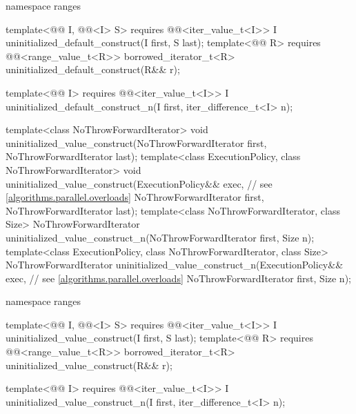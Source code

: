 \begin{codeblock}
{  namespace ranges {
    template<@@ I, @@<I> S>
      requires @@<iter_value_t<I>>
        I uninitialized_default_construct(I first, S last);
    template<@@ R>
      requires @@<range_value_t<R>>
        borrowed_iterator_t<R> uninitialized_default_construct(R&& r);

    template<@@ I>
      requires @@<iter_value_t<I>>
        I uninitialized_default_construct_n(I first, iter_difference_t<I> n);
  }

  template<class NoThrowForwardIterator>
    void uninitialized_value_construct(NoThrowForwardIterator first,
                                       NoThrowForwardIterator last);
  template<class ExecutionPolicy, class NoThrowForwardIterator>
    void uninitialized_value_construct(ExecutionPolicy&& exec,  // see \ref{algorithms.parallel.overloads}
                                       NoThrowForwardIterator first,
                                       NoThrowForwardIterator last);
  template<class NoThrowForwardIterator, class Size>
    NoThrowForwardIterator
      uninitialized_value_construct_n(NoThrowForwardIterator first, Size n);
  template<class ExecutionPolicy, class NoThrowForwardIterator, class Size>
    NoThrowForwardIterator
      uninitialized_value_construct_n(ExecutionPolicy&& exec,   // see \ref{algorithms.parallel.overloads}
                                      NoThrowForwardIterator first, Size n);

  namespace ranges {
    template<@@ I, @@<I> S>
      requires @@<iter_value_t<I>>
        I uninitialized_value_construct(I first, S last);
    template<@@ R>
      requires @@<range_value_t<R>>
        borrowed_iterator_t<R> uninitialized_value_construct(R&& r);

    template<@@ I>
      requires @@<iter_value_t<I>>
        I uninitialized_value_construct_n(I first, iter_difference_t<I> n);
  }

}
\end{codeblock}
